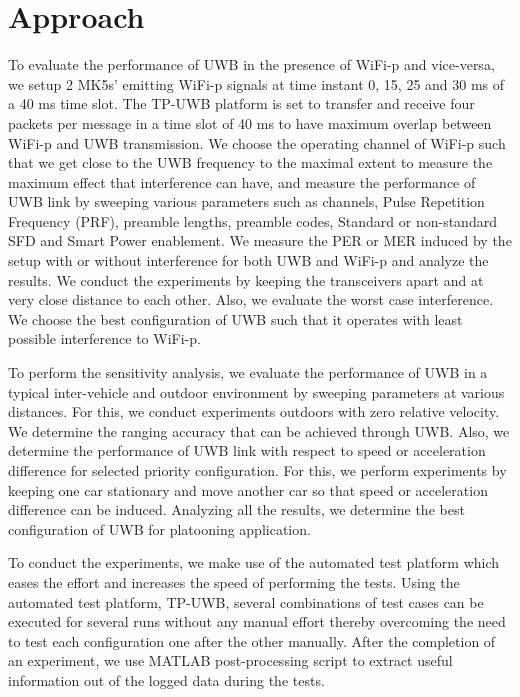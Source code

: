 \section{Approach}
To evaluate the performance of UWB in the presence of WiFi-p and vice-versa, we setup 2 MK5s' \cite{cohdaMK5} emitting WiFi-p signals at time instant 0, 15, 25 and 30 ms of a 40 ms time slot. The TP-UWB platform is set to transfer and receive four packets per message in a time slot of 40 ms to have maximum overlap between WiFi-p and UWB transmission. We choose the operating channel of WiFi-p such that we get close to the UWB frequency to the maximal extent to measure the maximum effect that interference can have, and measure the performance of UWB link by sweeping various parameters such as channels, Pulse Repetition Frequency (PRF), preamble lengths, preamble codes, Standard or non-standard SFD and Smart Power enablement. We measure the PER or MER induced by the setup with or without interference for both UWB and WiFi-p and analyze the results. We conduct the experiments by keeping the transceivers apart and at very close distance to each other. Also, we evaluate the worst case interference. We choose the best configuration of UWB such that it operates with least possible interference to WiFi-p.

To perform the sensitivity analysis, we evaluate the performance of UWB in a typical inter-vehicle and outdoor environment by sweeping parameters at various distances. For this, we conduct experiments outdoors with zero relative velocity. We determine the ranging accuracy that can be achieved through UWB. Also, we determine the performance of UWB link with respect to speed or acceleration difference for selected priority configuration. For this, we perform experiments by keeping one car stationary and move another car so that speed or acceleration difference can be induced. Analyzing all the results, we determine the best configuration of UWB for platooning application.

To conduct the experiments, we make use of the automated test platform which eases the effort and increases the speed of performing the tests. Using the automated test platform, TP-UWB,  several combinations of test cases can be executed for several runs without any manual effort thereby overcoming the need to test each configuration one after the other manually. After the completion of an experiment, we use MATLAB post-processing script to extract useful information out of the logged data during the tests. 

